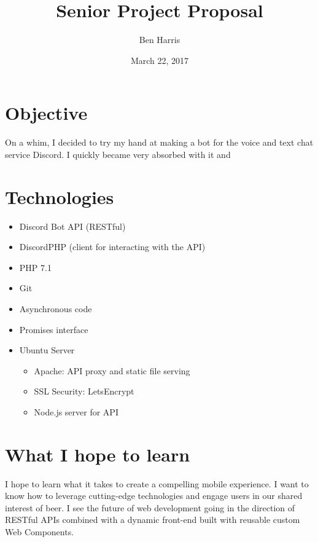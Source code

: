 \documentclass[11pt]{article}
\title{Senior Project Proposal}
\date{March 22, 2017}
\author{Ben Harris}
\begin{document}
    \maketitle

    \section{Objective}

        On a whim, I decided to try my hand at making a bot for the voice and text chat service Discord. I quickly became very absorbed with it and

    \section{Technologies}

        \begin{itemize}
            \item Discord Bot API (RESTful)
            \item DiscordPHP (client for interacting with the API)
            \item PHP 7.1
            \item Git
            \item Asynchronous code
            \item Promises interface
            \item Ubuntu Server
                \begin{itemize}
                    \item Apache: API proxy and static file serving
                    \item SSL Security: LetsEncrypt
                    \item Node.js server for API
                \end{itemize}

        \end{itemize}

    \section{What I hope to learn}

        I hope to learn what it takes to create a compelling mobile experience. I want to know how to leverage cutting-edge technologies and engage users in our shared interest of beer. I see the future of web development going in the direction of RESTful APIs combined with a dynamic front-end built with reusable custom Web Components.
\end{document}
